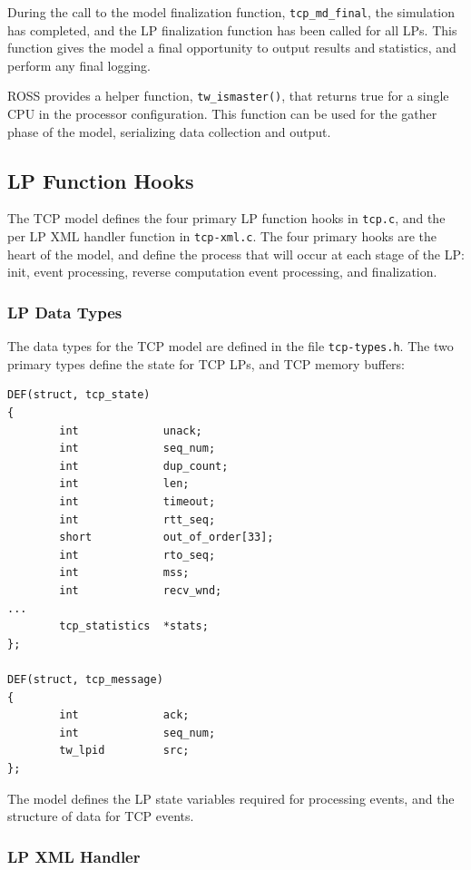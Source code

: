 \documentclass[conference,onecolumn]{IEEEtran}
\begin{document}
During the call to the model finalization function, {\tt tcp\_md\_final}, the simulation has completed, and the LP finalization function has been called for all LPs.  This function gives the model a final opportunity to output results and statistics, and perform any final logging.

ROSS provides a helper function, {\tt tw\_ismaster()}, that returns true for a single CPU in the processor configuration.  This function can be used for the gather phase of the model, serializing data collection and output.

\subsection{LP Function Hooks}

The TCP model defines the four primary LP function hooks in {\tt tcp.c}, and the per LP XML handler function in {\tt tcp-xml.c}.  The four primary hooks are the heart of the model, and define the process that will occur at each stage of the LP: init, event processing, reverse computation event processing, and finalization.

\subsubsection{LP Data Types}

The data types for the TCP model are defined in the file {\tt tcp-types.h}.  The two primary types define the state for TCP LPs, and TCP memory buffers:

\begin{small}\begin{verbatim}
DEF(struct, tcp_state)
{
        int             unack;
        int             seq_num;
        int             dup_count;
        int             len;
        int             timeout;
        int             rtt_seq;
        short           out_of_order[33];
        int             rto_seq;
        int             mss;
        int             recv_wnd;
...
        tcp_statistics  *stats;
};

DEF(struct, tcp_message)
{
        int             ack;
        int             seq_num;
        tw_lpid         src;
};
\end{verbatim}\end{small}

The model defines the LP state variables required for processing events, and the structure of data for TCP events.
 
\subsubsection{LP XML Handler}
\end{document}

